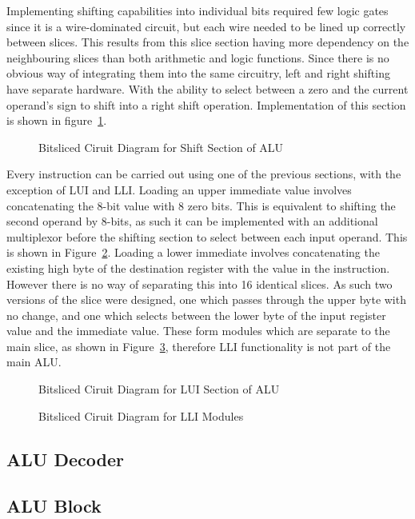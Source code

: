 Implementing shifting capabilities into individual bits required few logic gates since it is a wire-dominated circuit, but each wire needed to be lined up correctly between slices. This results from this slice section having more dependency on the neighbouring slices than both arithmetic and logic functions. Since there is no obvious way of integrating them into the same circuitry, left and right shifting have separate hardware. With the ability to select between a zero and the current operand's sign to shift into a right shift operation. Implementation of this section is shown in figure~\ref{fig:ShiftSlice}. 

\begin{figure}[h]
	\caption{Bitsliced Ciruit Diagram for Shift Section of ALU}
	\label{fig:ShiftSlice}
\end{figure}

Every instruction can be carried out using one of the previous sections, with the exception of LUI and LLI. Loading an upper immediate value involves concatenating the 8-bit value with 8 zero bits. This is equivalent to shifting the second operand by 8-bits, as such it can be implemented with an additional multiplexor before the shifting section to select between each input operand. This is shown in Figure~\ref{fig:LUISlice}. Loading a lower immediate involves concatenating the existing high byte of the destination register with the value in the instruction. However there is no way of separating this into 16 identical slices. As such two versions of the slice were designed, one which passes through the upper byte with no change, and one which selects between the lower byte of the input register value and the immediate value. These form modules which are separate to the main slice, as shown in Figure~\ref{fig:LLISlices}, therefore LLI functionality is not part of the main ALU. 

\begin{figure}[h]
	\caption{Bitsliced Ciruit Diagram for LUI Section of ALU}
	\label{fig:LUISlice}
\end{figure}

\begin{figure}[h]
	\caption{Bitsliced Ciruit Diagram for LLI Modules}
	\label{fig:LLISlices}
\end{figure}

\subsection{ALU Decoder}


\subsection{ALU Block}

